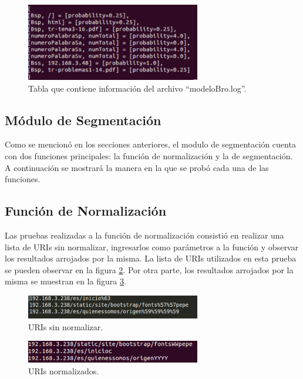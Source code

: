 \begin{figure}[!htb]
\begin{center}
\includegraphics[width=3in]{./img/tablaModeloBro.png}
\caption{Tabla que contiene información del archivo ``modeloBro.log''.}
\label{fig:modelResult}
\end{center}
\end{figure}

\subsection*{Módulo de Segmentación}

Como se mencionó en los secciones anteriores, el modulo de segmentación
cuenta con dos funciones principales: la función de normalización y la de
segmentación. A continuación se mostrará la manera en la que se probó cada una de las funciones.

\subsection*{Función de Normalización}

Las pruebas realizadas a la función de normalización consistió en realizar una lista de URIs sin normalizar, ingresarlos como parámetros a la función y observar los resultados arrojados por la misma.
La lista de URIs utilizados en esta prueba se pueden observar en la figura \ref{fig:uriSinNorm}. Por otra parte, los resultados arrojados por la misma se muestran en la
figura \ref{fig:uriNorm}.

\begin{figure}[!htb]
\begin{center}
\includegraphics[width=3in]{./img/uriSinNorm.png}
\caption{URIs sin normalizar.}
\label{fig:uriSinNorm}
\end{center}
\end{figure}

\begin{figure}[!htb]
\begin{center}
\includegraphics[width=3in]{./img/uriNorm.png}
\caption{URIs normalizados.}
\label{fig:uriNorm}
\end{center}
\end{figure}


